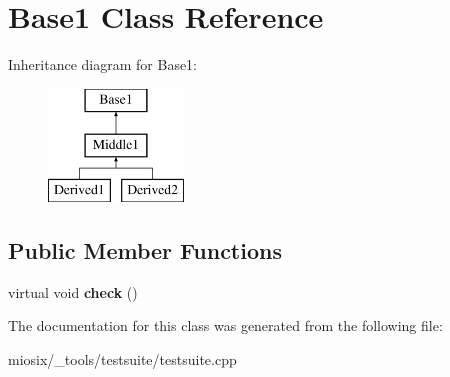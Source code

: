 \hypertarget{class_base1}{\section{Base1 Class Reference}
\label{class_base1}
}
Inheritance diagram for Base1\-:\begin{figure}[H]
\begin{center}
\leavevmode
\includegraphics[height=3.000000cm]{class_base1}
\end{center}
\end{figure}
\subsection*{Public Member Functions}
\begin{DoxyCompactItemize}
\item 
\hypertarget{class_base1_a879c0edb4f3cfe9159b0048defdde219}{virtual void {\bfseries check} ()}\label{class_base1_a879c0edb4f3cfe9159b0048defdde219}

\end{DoxyCompactItemize}


The documentation for this class was generated from the following file\-:\begin{DoxyCompactItemize}
\item 
miosix/\-\_\-tools/testsuite/testsuite.\-cpp\end{DoxyCompactItemize}
